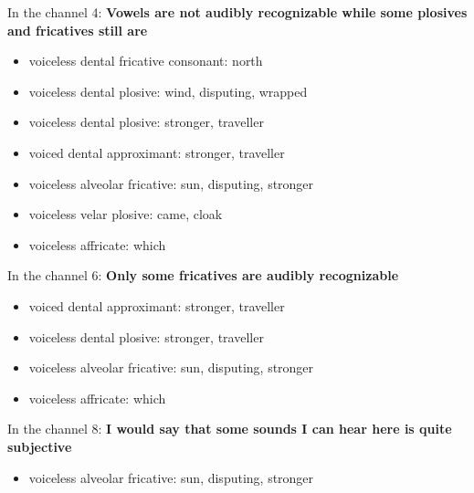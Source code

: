 \documentclass{../labbook}
\begin{document}
\begin{solution}
In the channel 4: \textbf{Vowels are not audibly recognizable while some plosives and fricatives still are}
\begin{itemize}
    \item voiceless dental fricative consonant: north
    \item voiceless dental plosive: wind, disputing, wrapped 
    \item voiceless dental plosive: stronger, traveller
    \item voiced dental approximant: stronger, traveller
    \item voiceless alveolar fricative: sun, disputing, stronger
    \item voiceless velar plosive: came, cloak    
    \item voiceless affricate: which
\end{itemize}

In the channel 6: \textbf{Only some fricatives are audibly recognizable}
\begin{itemize}
    \item voiced dental approximant: stronger, traveller
    \item voiceless dental plosive: stronger, traveller
    \item voiceless alveolar fricative: sun, disputing, stronger 
    \item voiceless affricate: which
\end{itemize}

In the channel 8: \textbf{I would say that some sounds I can hear here is quite subjective}
\begin{itemize}
    \item voiceless alveolar fricative: sun, disputing, stronger 
\end{itemize}

\end{solution}
\end{document}
